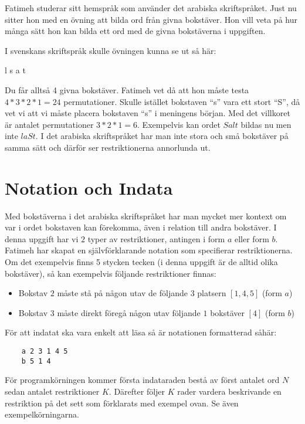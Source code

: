 
Fatimeh studerar sitt hemspråk som använder det arabiska skriftspråket. Just nu
sitter hon med en övning att bilda ord från givna bokstäver. Hon vill veta på
hur många sätt hon kan bilda ett ord med de givna bokstäverna i uppgiften.

I svenskans skriftspråk skulle övningen kunna se ut så här:

\vspace{0.2in}
\centerline{l s a t}
\vspace{0.2in}

Du får alltså 4 givna bokstäver. Fatimeh vet då att hon måste testa $4*3*2*1 =
24$ permutationer. Skulle istället bokstaven ``s'' vara ett stort ``S'', då vet vi
att vi måste placera bokstaven ``s'' i meningens början. Med det villkoret är
antalet permutationer $3*2*1 = 6$.  Exempelvis kan ordet $Salt$ bildas nu men
inte $laSt$. I det arabiska skriftspråket har man inte stora och små bokstäver
på samma sätt och därför ser restriktionerna annorlunda ut.

\section*{Notation och Indata}

Med bokstäverna i det arabiska skriftspråket har man mycket mer kontext om var
i ordet bokstaven kan förekomma, även i relation till andra bokstäver.  I denna
upggift har vi $2$ typer av restriktioner, antingen i form $a$ eller form $b$. Fatimeh har skapat en
självförklarande notation som specifierar restriktionerna. Om det exempelvis
finns 5 stycken tecken (i denna uppgift är de alltid olika bokstäver), så kan
exempelvis följande restriktioner finnas:

\begin{itemize}
    \item Bokstav $2$ måste stå på någon utav de följande $3$ platsern $[1, 4, 5]$ (form $a$)
    \item Bokstav $3$ måste direkt föregå någon utav följande $1$ bokstäver $[4]$ (form $b$)
\end{itemize}

För att indatat ska vara enkelt att läsa så är notationen formatterad såhär:

\begin{lstlisting}
    a 2 3 1 4 5
    b 5 1 4
\end{lstlisting}

För programkörningen kommer första indataraden bestå av först antalet ord $N$
sedan antalet restriktioner $K$. Därefter följer $K$ rader vardera beskrivande
en restriktion på det sett som förklarats med exempel ovan. Se även
exempelkörningarna.


